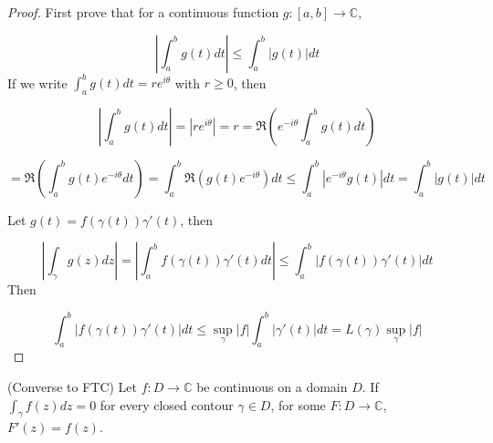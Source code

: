 \begin{proof}
	First prove that for a continuous function $g: [a, b] \rightarrow \mathbb{C}$,

	\[ \left | \int_a^b g(t) dt \right | \le \int_a^b |g(t)| dt \]
	If we write $\int_a^b g(t) dt = r e^{i \theta}$ with $r \ge 0$, then

	\[ \left | \int_a^b g(t) dt \right | = |r e^{i \theta}| = r = \Re \left( e^{-i \theta} \int_a^b g(t) dt \right ) \]

	\[ = \Re\left( \int_a^b g(t) e^{-i \theta} dt \right) = \int_a^b \Re( g(t) e^{-i \theta}) dt \le \int_a^b \left |e^{-i \theta} g(t) \right | dt = \int_a^b |g(t)| dt \]

	Let $g(t) = f(\gamma(t)) \gamma'(t)$, then

	\[ \left | \int_{\gamma} g(z) dz \right | = \left | \int_a^b f(\gamma(t)) \gamma'(t) dt \right | \le \int_a^b \left | f(\gamma(t)) \gamma'(t) \right | dt \]
	Then

	\[ \int_a^b \left | f(\gamma(t)) \gamma'(t) \right | dt \le \sup_{\gamma} |f| \int_a^b |\gamma'(t)| dt = L(\gamma) \sup_{\gamma} |f| \]
\end{proof}

\begin{theorem}
	(Converse to FTC) Let $f: D \rightarrow \mathbb{C}$ be continuous on a domain $D$. If $\int_{\gamma} f(z) dz = 0$ for every closed contour $\gamma \in D$, for some $F: D \rightarrow \mathbb{C}$, $F'(z) = f(z)$.
\end{theorem}

